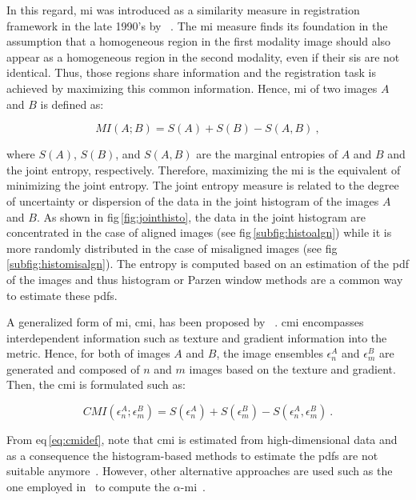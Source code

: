 In this regard, \ac{mi} was introduced as a similarity measure in registration framework in the late 1990's by \citeauthor{Pluim2003}~\cite{Pluim2003}.
The \ac{mi} measure finds its foundation in the assumption that a homogeneous region in the first modality image should also appear as a homogeneous region in the second modality, even if their \acp{si} are not identical.
Thus, those regions share information and the registration task is achieved by maximizing this common information.
Hence, \Ac{mi} of two images $A$ and $B$ is defined as:

\begin{equation}
	MI(A;B) = S(A) + S(B) - S(A,B) \ ,
	\label{eq:midef}
\end{equation}

\noindent where $S(A)$, $S(B)$, and $S(A,B)$ are the marginal entropies of $A$ and $B$ and the joint entropy, respectively.
Therefore, maximizing the \ac{mi} is the equivalent of minimizing the joint entropy. 
The joint entropy measure is related to the degree of uncertainty or dispersion of the data in the joint histogram of the images $A$ and $B$.
As shown in \acs{fig}\,\ref{fig:jointhisto}, the data in the joint histogram are concentrated in the case of aligned images (see \acs{fig}\,\ref{subfig:histoalgn}) while it is more randomly distributed in the case of misaligned images (see \acs{fig}\,\ref{subfig:histomisalgn}).
The entropy is computed based on an estimation of the \ac{pdf} of the images and thus histogram or Parzen window methods are a common way to estimate these \acp{pdf}.

A generalized form of \ac{mi}, \ac{cmi}, has been proposed by \citeauthor{Chappelow2011}~\cite{Chappelow2011}.
\ac{cmi} encompasses interdependent information such as texture and gradient information into the metric.
Hence, for both of images $A$ and $B$, the image ensembles $\epsilon^{A}_n$ and $\epsilon^{B}_m$ are generated and composed of $n$ and $m$ images based on the texture and gradient.
Then, the \ac{cmi} is formulated such as:

\begin{equation}
	CMI(\epsilon^{A}_n;\epsilon^{B}_m) = S(\epsilon^{A}_n) + S(\epsilon^{B}_m) - S(\epsilon^{A}_n,\epsilon^{B}_m) \ .
	\label{eq:cmidef}
\end{equation}

From \acs{eq}\,\eqref{eq:cmidef}, note that \ac{cmi} is estimated from high-dimensional data and as a consequence the histogram-based methods to estimate the \acp{pdf} are not suitable anymore~\cite{Chappelow2011}. 
However, other alternative approaches are used such as the one employed in~\cite{Staring2009} to compute the $\alpha$-\ac{mi}~\cite{Hero2002}.

